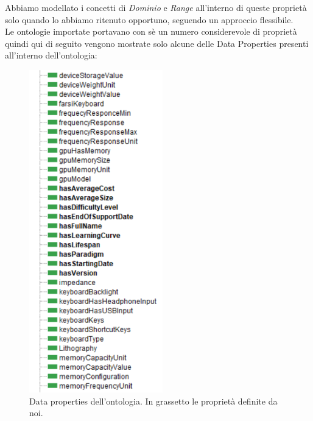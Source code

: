 Abbiamo modellato i concetti di \textit{Dominio} e \textit{Range} all'interno di queste proprietà solo quando lo abbiamo ritenuto opportuno, seguendo un approccio flessibile.\\

Le ontologie importate portavano con sè un numero considerevole di proprietà quindi qui di seguito vengono mostrate solo alcune delle Data Properties presenti all'interno dell'ontologia:

\begin{figure}[H]
    \centering
    \includegraphics[height=14cm]{docs/images/objpropWS.PNG}
    \caption{Data properties dell'ontologia. In grassetto le proprietà definite da noi.}
    \label{fig:datap_bdonto}
\end{figure}


